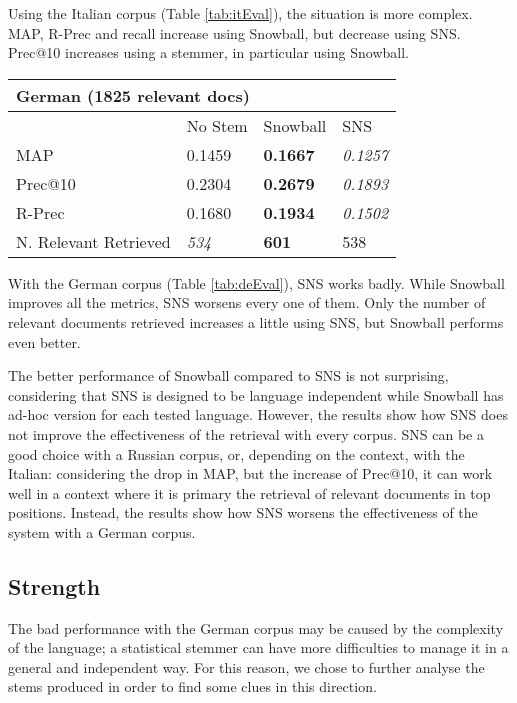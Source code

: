 Using the Italian corpus (Table \ref{tab:itEval}), the situation is more complex. MAP, R-Prec and recall increase using Snowball, but decrease using SNS. Prec@10 increases using a stemmer, in particular using Snowball. 

\begin{center}
   \begin{tabular}{| l | l | l | l |}
    \hline
    \multicolumn{4}{|l|}{\textbf{German (1825 relevant docs)}}\\ \hline
    & No Stem & Snowball & SNS\\ \hline
    MAP & 0.1459 & \textbf{0.1667} & \textit{0.1257} \\ \hline
    Prec@10 & 0.2304 & \textbf{0.2679} & \textit{0.1893} \\ \hline
    R-Prec & 0.1680 & \textbf{0.1934} & \textit{0.1502}\\ \hline
	N. Relevant Retrieved & \textit{534} & \textbf{601} & 538\\ \hline        
    \end{tabular}
    \label{tab:deEval}
\end{center}

With the German corpus (Table \ref{tab:deEval}), SNS works badly. While Snowball improves all the metrics, SNS worsens every one of them. Only the number of relevant documents retrieved increases a little using SNS, but Snowball performs even better.

The better performance of Snowball compared to SNS is not surprising, considering that SNS is designed to be language independent while Snowball has ad-hoc version for each tested language. However, the results show how SNS does not improve the effectiveness of the retrieval with every corpus. SNS can be a good choice with a Russian corpus, or, depending on the context, with the Italian: considering the drop in MAP, but the increase of Prec@10, it can work well in a context where it is primary the retrieval of relevant documents in top positions. Instead, the results show how SNS worsens the effectiveness of the system with a German corpus. 

\subsection{Strength}
The bad performance with the German corpus may be caused by the complexity of the language; a statistical stemmer can have more difficulties to manage it in a general and independent way. For this reason, we chose to further analyse the stems produced in order to find some clues in this direction.

